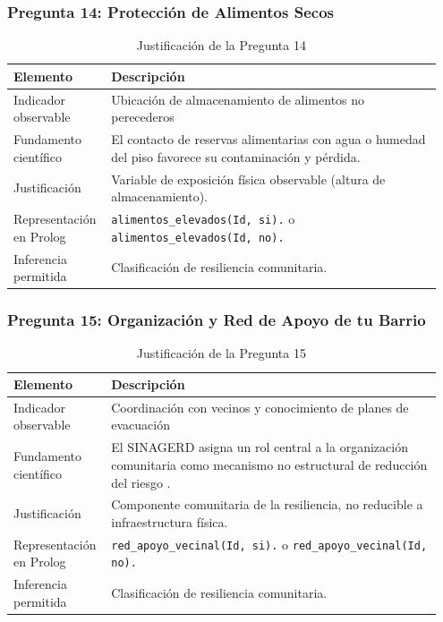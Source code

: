 \documentclass[12pt, letterpaper]{article}
\begin{document}
\subsubsection*{Pregunta 14: Protección de Alimentos Secos}
\begin{table}[H]
\centering
\caption{Justificación de la Pregunta 14}
\label{tab:p14}
\begin{tabular}{@{}p{0.2\linewidth}p{0.75\linewidth}@{}}
\toprule
\textbf{Elemento} & \textbf{Descripción} \\ \midrule
Indicador observable & Ubicación de almacenamiento de alimentos no perecederos \\
Fundamento científico & El contacto de reservas alimentarias con agua o humedad del piso favorece su contaminación y pérdida. \\
Justificación & Variable de exposición física observable (altura de almacenamiento). \\
Representación en Prolog & \texttt{alimentos\_elevados(Id, si).} o \texttt{alimentos\_elevados(Id, no).} \\
Inferencia permitida & Clasificación de resiliencia comunitaria. \\ \bottomrule
\end{tabular}
\end{table}

\subsubsection*{Pregunta 15: Organización y Red de Apoyo de tu Barrio}
\begin{table}[H]
\centering
\caption{Justificación de la Pregunta 15}
\label{tab:p15}
\begin{tabular}{@{}p{0.2\linewidth}p{0.75\linewidth}@{}}
\toprule
\textbf{Elemento} & \textbf{Descripción} \\ \midrule
Indicador observable & Coordinación con vecinos y conocimiento de planes de evacuación \\
Fundamento científico & El SINAGERD asigna un rol central a la organización comunitaria como mecanismo no estructural de reducción del riesgo \parencite{cenepred_manual_evar}. \\
Justificación & Componente comunitaria de la resiliencia, no reducible a infraestructura física. \\
Representación en Prolog & \texttt{red\_apoyo\_vecinal(Id, si).} o \texttt{red\_apoyo\_vecinal(Id, no).} \\
Inferencia permitida & Clasificación de resiliencia comunitaria. \\ \bottomrule
\end{tabular}
\end{table}
\end{document}
